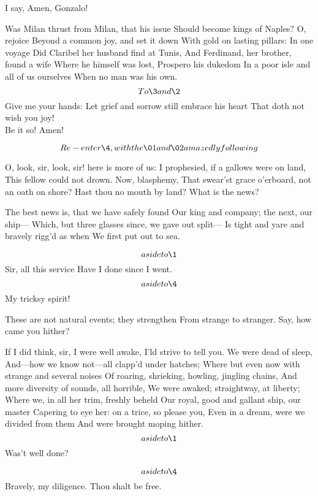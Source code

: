\documentclass[11pt]{book}
\begin{document}
\6	I say, Amen, Gonzalo!

\9	Was Milan thrust from Milan, that his issue
	Should become kings of Naples? O, rejoice
	Beyond a common joy, and set it down
	With gold on lasting pillars: In one voyage
	Did Claribel her husband find at Tunis,
	And Ferdinand, her brother, found a wife
	Where he himself was lost, Prospero his dukedom
	In a poor isle and all of us ourselves
	When no man was his own. \\

\6	\[To \3 and \2\]
   Give me your hands:
	Let grief and sorrow still embrace his heart
	That doth not wish you joy! \\

\9	Be it so! Amen!

	\[Re-enter \4, with the \01 and \02 amazedly following\]

	O, look, sir, look, sir! here is more of us:
	I prophesied, if a gallows were on land,
	This fellow could not drown. Now, blasphemy,
	That swear'st grace o'erboard, not an oath on shore?
	Hast thou no mouth by land? What is the news?

	The best news is, that we have safely found
	Our king and company; the next, our ship---
	Which, but three glasses since, we gave out split---
	Is tight and yare and bravely rigg'd as when
	We first put out to sea.

\4	\[aside to \1\]  Sir, all this service
	Have I done since I went. \\

\1	\[aside to \4\]  My tricksy spirit!

\6	These are not natural events; they strengthen
	From strange to stranger. Say, how came you hither?

	If I did think, sir, I were well awake,
	I'ld strive to tell you. We were dead of sleep,
	And---how we know not---all clapp'd under hatches;
	Where but even now with strange and several noises
	Of roaring, shrieking, howling, jingling chains,
	And more diversity of sounds, all horrible,
	We were awaked; straightway, at liberty;
	Where we, in all her trim, freshly beheld
	Our royal, good and gallant ship, our master
	Capering to eye her: on a trice, so please you,
	Even in a dream, were we divided from them
	And were brought moping hither. \\

\4	\[aside to \1\]          Was't well done?

\1	\[aside to \4\]  Bravely, my diligence. Thou shalt be free.
\end{document}
